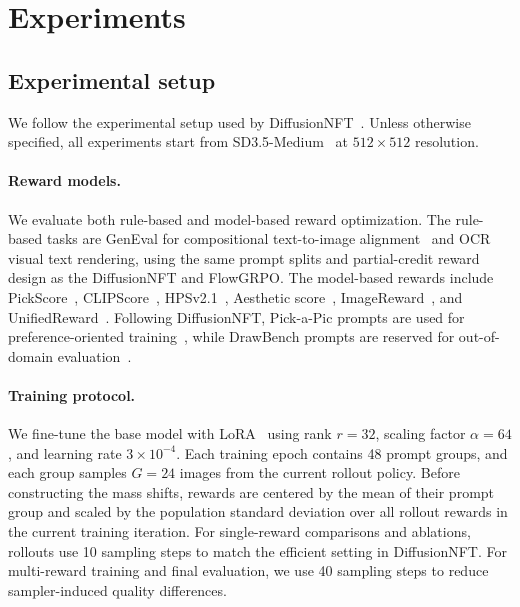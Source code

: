 \documentclass{article} %
\begin{document}
\section{Experiments}
\label{sec:experiments}

\subsection{Experimental setup}
\label{sec: exp-setting}
We follow the experimental setup used by DiffusionNFT~\citep{zheng2026diffusionnft}. Unless otherwise specified, all experiments start from SD3.5-Medium~\citep{esser2024scaling} at $512 \times 512$ resolution.

\paragraph{Reward models.}
We evaluate both rule-based and model-based reward optimization. The rule-based tasks are GenEval for compositional text-to-image alignment~\citep{ghosh2023geneval} and OCR visual text rendering, using the same prompt splits and partial-credit reward design as the DiffusionNFT and FlowGRPO. The model-based rewards include PickScore~\citep{kirstain2023pickapic}, CLIPScore~\citep{hessel2021clipscore}, HPSv2.1~\citep{wu2023human}, Aesthetic score~\citep{schuhmann2022laion}, ImageReward~\citep{xu2023imagereward}, and UnifiedReward~\citep{wang2025unifiedreward}. Following DiffusionNFT, Pick-a-Pic prompts are used for preference-oriented training~\citep{kirstain2023pickapic}, while DrawBench prompts are reserved for out-of-domain evaluation~\citep{saharia2022photorealistic}.

\paragraph{Training protocol.}
We fine-tune the base model with LoRA~\citep{hu2022lora} using rank $r=32$, scaling factor $\alpha=64$, and learning rate $3 \times 10^{-4}$. Each training epoch contains 48 prompt groups, and each group samples $G=24$ images from the current rollout policy. Before constructing the mass shifts, rewards are centered by the mean of their prompt group and scaled by the population standard deviation over all rollout rewards in the current training iteration. For single-reward comparisons and ablations, rollouts use 10 sampling steps to match the efficient setting in DiffusionNFT. For multi-reward training and final evaluation, we use 40 sampling steps to reduce sampler-induced quality differences.
\end{document}
